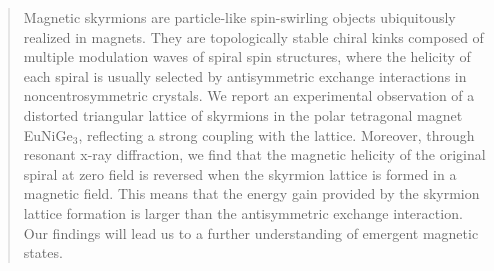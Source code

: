 \documentclass[aps,prb,reprint,superscriptaddress,amsmath,amssymb]{revtex4-2}
\begin{document}

\date{\today}

\begin{abstract}
Magnetic skyrmions are particle-like spin-swirling objects ubiquitously realized in magnets. 
They are topologically stable chiral kinks composed of multiple modulation waves of spiral spin structures, where the helicity of each spiral is usually selected by antisymmetric exchange interactions in noncentrosymmetric crystals. 
We report an experimental observation of a distorted triangular lattice of skyrmions in the polar tetragonal magnet EuNiGe$_3$, reflecting a strong coupling with the lattice. 
Moreover, through resonant x-ray diffraction, we find that the magnetic helicity of the original spiral at zero field is reversed when the skyrmion lattice is formed in a magnetic field. 
This means that the energy gain provided by the skyrmion lattice formation is larger than the antisymmetric exchange interaction. 
Our findings will lead us to a further understanding of emergent magnetic states. 
\end{abstract}


\maketitle

\end{document}

